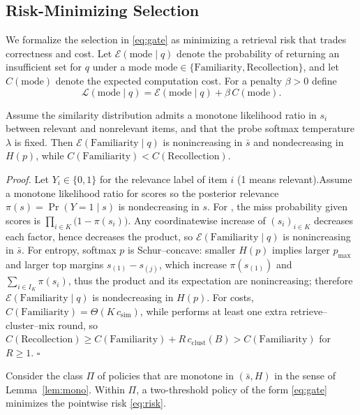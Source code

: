 \subsection{Risk-Minimizing Selection}
We formalize the selection in \eqref{eq:gate} as minimizing a retrieval risk that trades correctness and cost.
Let $\mathcal{E}(\text{mode}\mid q)$ denote the probability of returning an insufficient set for $q$ under a mode $\text{mode}\in\{\text{Familiarity},\text{Recollection}\}$, and let $C(\text{mode})$ denote the expected computation cost.
For a penalty $\beta>0$ define
\begin{equation}
\mathcal{L}(\text{mode}\mid q)=\mathcal{E}(\text{mode}\mid q)+\beta\, C(\text{mode}).
\label{eq:risk}
\end{equation}

\begin{lemma}
\label{lem:mono}
Assume the similarity distribution admits a monotone likelihood ratio in $s_i$ between relevant and nonrelevant items, and that the probe softmax temperature $\lambda$ is fixed.
Then $\mathcal{E}(\text{Familiarity}\mid q)$ is nonincreasing in $\bar{s}$ and nondecreasing in $H(p)$, while $C(\text{Familiarity})<C(\text{Recollection})$.
\end{lemma}


\noindent\emph{Proof.}
Let $Y_i\in\{0,1\}$ for the relevance label of item $i$ (1 means relevant).Assume a monotone likelihood ratio for scores so the posterior relevance $\pi(s)=\Pr(Y=1\mid s)$ is nondecreasing in $s$.
For , the miss probability given scores is $\prod_{i\in K}\bigl(1-\pi(s_i)\bigr)$.
Any coordinatewise increase of $(s_i)_{i\in K}$ decreases each factor, hence decreases the product, so $\mathcal{E}(\text{Familiarity}\mid q)$ is nonincreasing in $\bar s$.
For entropy, softmax $p$ is Schur–concave: smaller $H(p)$ implies larger $p_{\max}$ and larger top margins $s_{(1)}-s_{(j)}$, which increase $\pi(s_{(1)})$ and $\sum_{i\in I_K}\pi(s_i)$, thus the product and its expectation are nonincreasing; therefore $\mathcal{E}(\text{Familiarity}\mid q)$ is nondecreasing in $H(p)$.
For costs, $C(\text{Familiarity})=\Theta(K\,c_{\mathrm{sim}})$, while  performs at least one extra retrieve–cluster–mix round, so $C(\text{Recollection})\ge C(\text{Familiarity})+R\,c_{\mathrm{clust}}(B)>C(\text{Familiarity})$ for $R\ge1$.
\hfill$\square$

\begin{theorem}
\label{thm:gate-opt}
Consider the class $\Pi$ of policies that are monotone in $(\bar{s},H)$ in the sense of Lemma~\ref{lem:mono}.
Within $\Pi$, a two-threshold policy of the form \eqref{eq:gate} minimizes the pointwise risk \eqref{eq:risk}.
\end{theorem}

